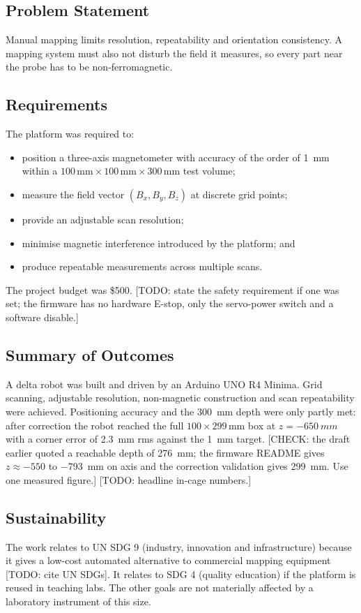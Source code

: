 \documentclass[conference]{IEEEtran}
\begin{document}
\subsection{Problem Statement}
Manual mapping limits resolution, repeatability and orientation consistency. A
mapping system must also not disturb the field it measures, so every part near the
probe has to be non-ferromagnetic.

\subsection{Requirements}
The platform was required to:
\begin{itemize}
\item position a three-axis magnetometer with accuracy of the order of \SI{1}{mm}
within a $100\,\mathrm{mm}\times100\,\mathrm{mm}\times300\,\mathrm{mm}$ test volume;
\item measure the field vector $(B_x,B_y,B_z)$ at discrete grid points;
\item provide an adjustable scan resolution;
\item minimise magnetic interference introduced by the platform; and
\item produce repeatable measurements across multiple scans.
\end{itemize}
The project budget was \$500. [TODO: state the safety requirement if one was set; the
firmware has no hardware E-stop, only the servo-power switch and a software disable.]

\subsection{Summary of Outcomes}
A delta robot was built and driven by an Arduino UNO R4 Minima. Grid scanning,
adjustable resolution, non-magnetic construction and scan repeatability were achieved.
Positioning accuracy and the \SI{300}{mm} depth were only partly met: after correction
the robot reached the full $100\times299$\,mm box at $z=\SI{-650}{mm}$ with a corner
error of \SI{2.3}{mm} rms against the \SI{1}{mm} target. [CHECK: the draft earlier quoted
a reachable depth of \SI{276}{mm}; the firmware README gives $z\approx-550$ to
\SI{-793}{mm} on axis and the correction validation gives \SI{299}{mm}. Use one
measured figure.] [TODO: headline in-cage numbers.]

\subsection{Sustainability}
The work relates to UN SDG 9 (industry, innovation and infrastructure) because it
gives a low-cost automated alternative to commercial mapping equipment
[TODO: cite UN SDGs]. It relates to SDG 4 (quality education) if the platform is reused in teaching labs. The other goals are
not materially affected by a laboratory instrument of this size.
\end{document}
